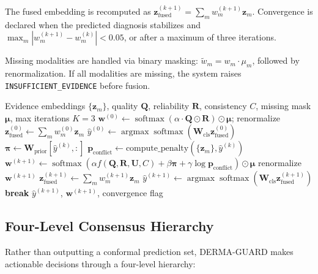 \documentclass[conference]{IEEEtran}
\DeclareMathOperator*{\argmax}{argmax}
\DeclareMathOperator*{\softmax}{softmax}
\begin{document}
The fused embedding is recomputed as $\mathbf{z}_{\text{fused}}^{(k+1)} = \sum_m w_m^{(k+1)} \mathbf{z}_m$. Convergence is declared when the predicted diagnosis stabilizes and $\max_m |w_m^{(k+1)} - w_m^{(k)}| < 0.05$, or after a maximum of three iterations.

Missing modalities are handled via binary masking: $\tilde{w}_m = w_m \cdot \mu_m$, followed by renormalization. If all modalities are missing, the system raises \texttt{INSUFFICIENT\_EVIDENCE} before fusion.

\begin{algorithm}[t]
\caption{Iterative Diagnosis-Adaptive Fusion}
\label{alg:fusion}
\begin{algorithmic}[1]
\REQUIRE Evidence embeddings $\{\mathbf{z}_m\}$, quality $\mathbf{Q}$, reliability $\mathbf{R}$, consistency $C$, missing mask $\boldsymbol{\mu}$, max iterations $K=3$
\STATE $\mathbf{w}^{(0)} \leftarrow \softmax(\alpha \cdot \mathbf{Q} \odot \mathbf{R}) \odot \boldsymbol{\mu}$; renormalize
\STATE $\mathbf{z}_{\text{fused}}^{(0)} \leftarrow \sum_m w_m^{(0)} \mathbf{z}_m$
\STATE $\hat{y}^{(0)} \leftarrow \argmax \softmax(\mathbf{W}_{\text{cls}} \mathbf{z}_{\text{fused}}^{(0)})$
    \STATE $\boldsymbol{\pi} \leftarrow \mathbf{W}_{\text{prior}}[\hat{y}^{(k)}, :]$
    \STATE $\mathbf{p}_{\text{conflict}} \leftarrow \text{compute\_penalty}(\{\mathbf{z}_m\}, \hat{y}^{(k)})$
    \STATE $\mathbf{w}^{(k+1)} \leftarrow \softmax( \alpha f(\mathbf{Q},\mathbf{R},\mathbf{U},C) + \beta \boldsymbol{\pi} + \gamma \log \mathbf{p}_{\text{conflict}} ) \odot \boldsymbol{\mu}$
    \STATE renormalize $\mathbf{w}^{(k+1)}$
    \STATE $\mathbf{z}_{\text{fused}}^{(k+1)} \leftarrow \sum_m w_m^{(k+1)} \mathbf{z}_m$
    \STATE $\hat{y}^{(k+1)} \leftarrow \argmax \softmax(\mathbf{W}_{\text{cls}} \mathbf{z}_{\text{fused}}^{(k+1)})$
        \STATE \textbf{break}
    \ENDIF
\ENDFOR
\RETURN $\hat{y}^{(k+1)}$, $\mathbf{w}^{(k+1)}$, convergence flag
\end{algorithmic}
\end{algorithm}

\subsection{Four-Level Consensus Hierarchy}

Rather than outputting a conformal prediction set, DERMA-GUARD makes actionable decisions through a four-level hierarchy:
\end{document}
